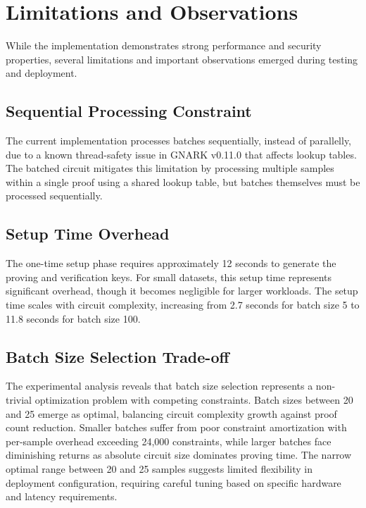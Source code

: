 \section{Limitations and Observations}

While the implementation demonstrates strong performance and security properties, several limitations and important observations emerged during testing and deployment.

\subsection{Sequential Processing Constraint}

The current implementation processes batches sequentially, instead of parallelly, due to a known thread-safety issue in GNARK v0.11.0 that affects lookup tables. The batched circuit mitigates this limitation by processing multiple samples within a single proof using a shared lookup table, but batches themselves must be processed sequentially.

\subsection{Setup Time Overhead}

The one-time setup phase requires approximately 12 seconds to generate the proving and verification keys. For small datasets, this setup time represents significant overhead, though it becomes negligible for larger workloads. The setup time scales with circuit complexity, increasing from 2.7 seconds for batch size 5 to 11.8 seconds for batch size 100.

\subsection{Batch Size Selection Trade-off}

The experimental analysis reveals that batch size selection represents a non-trivial optimization problem with competing constraints. Batch sizes between 20 and 25 emerge as optimal, balancing circuit complexity growth against proof count reduction. Smaller batches suffer from poor constraint amortization with per-sample overhead exceeding 24,000 constraints, while larger batches face diminishing returns as absolute circuit size dominates proving time. The narrow optimal range between 20 and 25 samples suggests limited flexibility in deployment configuration, requiring careful tuning based on specific hardware and latency requirements.

